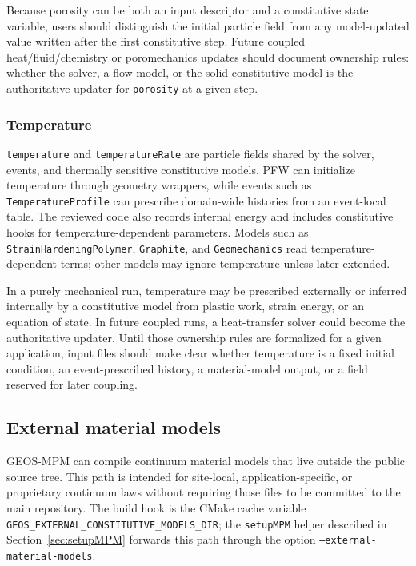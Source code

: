 Because porosity can be both an input descriptor and a constitutive state variable, users should distinguish the initial particle field from any model-updated value written after the first constitutive step.  Future coupled heat/fluid/chemistry or poromechanics updates should document ownership rules: whether the solver, a flow model, or the solid constitutive model is the authoritative updater for \texttt{porosity} at a given step.

\subsubsection{Temperature}
\label{subsubsec:constitutive-temperature}

\texttt{temperature} and \texttt{temperatureRate} are particle fields shared by the solver, events, and thermally sensitive constitutive models.  PFW can initialize temperature through geometry wrappers, while events such as \texttt{TemperatureProfile} can prescribe domain-wide histories from an event-local table.  The reviewed code also records internal energy and includes constitutive hooks for temperature-dependent parameters.  Models such as \texttt{StrainHardeningPolymer}, \texttt{Graphite}, and \texttt{Geomechanics} read temperature-dependent terms; other models may ignore temperature unless later extended.

In a purely mechanical run, temperature may be prescribed externally or inferred internally by a constitutive model from plastic work, strain energy, or an equation of state.  In future coupled runs, a heat-transfer solver could become the authoritative updater.  Until those ownership rules are formalized for a given application, input files should make clear whether temperature is a fixed initial condition, an event-prescribed history, a material-model output, or a field reserved for later coupling.

\subsection{External material models}
\label{subsec:external-material-models}

GEOS-MPM can compile continuum material models that live outside the public source tree.  This path is intended for site-local, application-specific, or proprietary continuum laws without requiring those files to be committed to the main repository.  The build hook is the CMake cache variable \texttt{GEOS\_EXTERNAL\_CONSTITUTIVE\_MODELS\_DIR}; the \texttt{setupMPM} helper described in Section~\ref{sec:setupMPM} forwards this path through the option \texttt{--external-material-models}.

